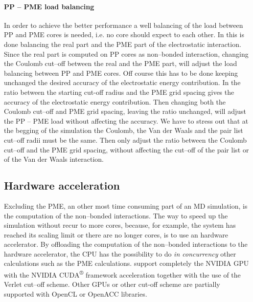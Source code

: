 \paragraph{\textbf{PP -- PME load balancing}} In order to achieve the better performance a well balancing of the load between \ac{PP} and \ac{PME} cores is needed, i.e. no core should expect to each other. In \gromacs this is done balancing the real part and the \ac{PME} part of the electrostatic interaction. Since the real part is computed on \ac{PP} cores as non--bonded interaction, changing the Coulomb cut--off between the real and the \ac{PME} part, will adjust the load balancing between \ac{PP} and \ac{PME} cores. Off course this has to be done keeping unchanged the desired accuracy of the electrostatic energy contribution. In \gromacs the ratio between the starting cut-off radius and the \ac{PME} grid spacing gives the accuracy of the electrostatic energy contribution. Then changing both the Coulomb cut--off and \ac{PME} grid spacing, leaving the ratio unchanged, will adjust the \ac{PP} -- \ac{PME} load without affecting the accuracy. We have to stress out that at the begging of the simulation the Coulomb, the Van der Waals and the pair list cut--off radii must be the same. Then \gromacs only adjust the ratio between the Coulomb cut--off and the \ac{PME} grid spacing, without affecting the cut--off of the pair list or of the Van der Waals interaction.

\subsection{Hardware acceleration}
Excluding the \ac{PME}, an other most time consuming part of an \ac{MD} simulation, is the computation of the non--bonded interactions. The way to speed up the simulation without recur to more cores, because, for example, the system has reached its scaling limit or there are no longer cores, is to use an hardware accelerator. By offloading the computation of the non--bonded interactions to the hardware accelerator, the CPU has the possibility to do \textit{in concurrency} other calculations such as the \ac{PME} calculations. \gromacs support completely the NVIDIA GPU with the NVIDIA CUDA\textsuperscript{®} framework acceleration together with the use of the Verlet cut--off scheme. Other GPUs or other cut-off scheme are partially supported with OpenCL or OpenACC libraries. 

